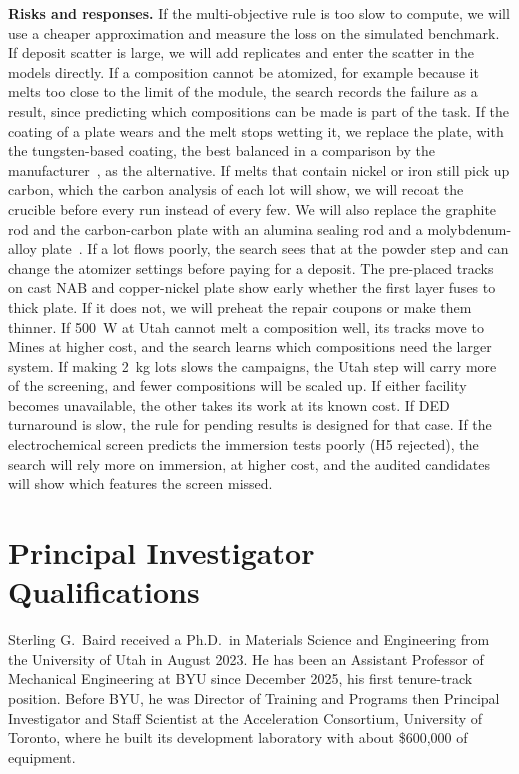 \documentclass[12pt,letterpaper]{article}
\begin{document}
\textbf{Risks and responses.} If the multi-objective rule is too slow to
compute, we will use a cheaper approximation and measure the loss on the
simulated benchmark. If deposit scatter is large, we will add replicates and
enter the scatter in the models directly. If a composition cannot
be atomized, for example because it melts too close to the limit of the
module, the search records the failure as a result, since predicting which
compositions can be made is part of the task. If the coating of a plate
wears and the melt stops wetting it, we replace the plate, with the
tungsten-based coating, the best balanced in a comparison by the
manufacturer~\cite{choma2026}, as the alternative. If melts that contain
nickel or iron still pick up carbon, which the carbon analysis of each lot
will show, we will recoat the crucible before every run instead of every
few. We will also replace the graphite rod and the carbon-carbon plate with
an alumina sealing rod and a molybdenum-alloy plate~\cite{ciftcli2025}. If a
lot flows poorly, the search sees that at the powder step and can change the
atomizer settings before paying for a deposit. The pre-placed tracks on cast NAB and
copper-nickel plate show early whether the first layer fuses to thick plate.
If it does not, we will preheat the repair coupons or make them thinner. If 500~W
at Utah cannot melt a composition well, its tracks move to Mines at higher
cost, and the search learns which compositions need the larger
system. If making 2~kg lots slows the campaigns, the Utah step will carry
more of the screening, and fewer compositions will be scaled up. If either
facility becomes unavailable, the other takes its work at its known cost.
If DED turnaround is slow, the rule for
pending results is designed for that case. If the electrochemical screen
predicts the immersion tests poorly (H5 rejected), the search will rely more
on immersion, at higher cost, and the audited candidates will show which
features the screen missed.

\section{Principal Investigator Qualifications}
\label{sec:quals}

Sterling G.\ Baird received a Ph.D.\ in Materials Science and Engineering
from the University of Utah in August 2023. He has been an Assistant
Professor of Mechanical Engineering at BYU since December 2025, his first
tenure-track position. Before BYU, he was Director of Training and Programs
then Principal Investigator and Staff Scientist at the Acceleration
Consortium, University of Toronto, where he built its development
laboratory with about \$600,000 of equipment.
\end{document}
